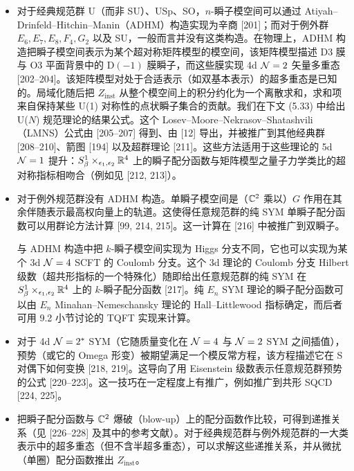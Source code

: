 \begin{itemize}[leftmargin=1.4em,itemsep=2pt,topsep=2pt]
\item
{} 对于经典规范群 U（而非 SU）、USp、SO，$n$-瞬子模空间可以通过 Atiyah--Drinfeld--Hitchin--Manin（ADHM）构造实现为辛商 [201]；而对于例外群 $E_6,E_7,E_8,F_4,G_2$ 以及 SU，一般而言并没有这类构造。在物理上，ADHM 构造把瞬子模空间表示为某个超对称矩阵模型的模空间，该矩阵模型描述 D3 膜与 O3 平面背景中的 D$(-1)$ 膜瞬子，而这些膜实现 4d $\mathcal{N}=2$ 矢量多重态 [202--204]。该矩阵模型对处于合适表示（如双基本表示）的超多重态是已知的。局域化随后把 $Z_{\mathrm{inst}}$ 从整个模空间上的积分约化为一个离散求和，求和项来自保持某些 U(1) 对称性的点状瞬子集合的贡献。我们在下文 (5.33) 中给出 U($N$) 规范理论的结果公式。这个 Losev--Moore--Nekrasov--Shatashvili（LMNS）公式由 [205--207] 得到、由 [12] 导出，并被推广到其他经典群 [208--210]、箭图 [194] 以及超群理论 [211]。这些方法适用于这些理论的 5d $\mathcal{N}=1$ 提升：$S^1_\beta\times_{\epsilon_1,\epsilon_2}\mathbb{R}^4$ 上的瞬子配分函数与矩阵模型之量子力学类比的超对称指标相吻合（例如见 [212, 213]）。

\item
{} 对于例外规范群没有 ADHM 构造。单瞬子模空间是（$\mathbb{C}^2$ 乘以）$G$ 作用在其余伴随表示最高权向量上的轨道。这使得任意规范群的纯 SYM 单瞬子配分函数可以用群论方法计算 [99, 214, 215]。这一计算在 [216] 中被推广到双瞬子。

与 ADHM 构造中把 $k$-瞬子模空间实现为 Higgs 分支不同，它也可以实现为某个 3d $\mathcal{N}=4$ SCFT 的 Coulomb 分支。这个 3d 理论的 Coulomb 分支 Hilbert 级数（超共形指标的一个特殊化）随即给出任意规范群的纯 SYM 在 $S^1_\beta\times_{\epsilon_1,\epsilon_2}\mathbb{R}^4$ 上的 $k$-瞬子配分函数 [217]。纯 $E_n$ SYM 理论的瞬子配分函数可以由 $E_n$ Minahan--Nemeschansky 理论的 Hall--Littlewood 指标确定，而后者可用 9.2 小节讨论的 TQFT 实现来计算。

\item
{} 对于 4d $\mathcal{N}=2^*$ SYM（它随质量变化在 $\mathcal{N}=4$ 与 $\mathcal{N}=2$ SYM 之间插值），预势（或它的 Omega 形变）被期望满足一个模反常方程，该方程描述它在 S 对偶下如何变换 [218, 219]。这导向了用 Eisenstein 级数表示任意规范群预势的公式 [220--223]。这一技巧在一定程度上有推广，例如推广到共形 SQCD [224, 225]。
\end{itemize}

\begin{itemize}[leftmargin=1.4em,itemsep=2pt,topsep=2pt]
\item
{} 把瞬子配分函数与 $\mathbb{C}^2$ 爆破（blow-up）上的配分函数作比较，可得到递推关系（见 [226--228] 及其中的参考文献）。对于经典规范群与例外规范群的一大类表示中的超多重态（但不含半超多重态），可以求解这些递推关系，并从微扰（单圈）配分函数推出 $Z_{\mathrm{inst}}$。
\end{itemize}

